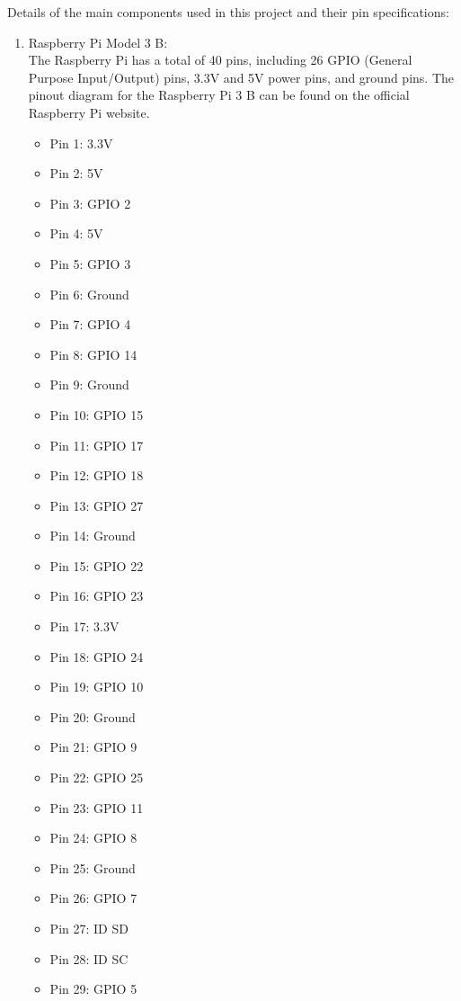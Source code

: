 \documentclass[11pt]{article}
\begin{document}
Details of the main components used in this project and their pin specifications:

\begin{enumerate}
	\item Raspberry Pi Model 3 B: \\
	      The Raspberry Pi has a total of 40 pins, including 26 GPIO (General Purpose Input/Output) pins, 3.3V and 5V power pins, and ground pins. The pinout diagram for the Raspberry Pi 3 B can be found on the official Raspberry Pi website.

	      \begin{itemize}
		      \item Pin 1: 3.3V
		      \item Pin 2: 5V
		      \item Pin 3: GPIO 2
		      \item Pin 4: 5V
		      \item Pin 5: GPIO 3
		      \item Pin 6: Ground
		      \item Pin 7: GPIO 4
		      \item Pin 8: GPIO 14
		      \item Pin 9: Ground
		      \item Pin 10: GPIO 15
		      \item Pin 11: GPIO 17
		      \item Pin 12: GPIO 18
		      \item Pin 13: GPIO 27
		      \item Pin 14: Ground
		      \item Pin 15: GPIO 22
		      \item Pin 16: GPIO 23
		      \item Pin 17: 3.3V
		      \item Pin 18: GPIO 24
		      \item Pin 19: GPIO 10
		      \item Pin 20: Ground
		      \item Pin 21: GPIO 9
		      \item Pin 22: GPIO 25
		      \item Pin 23: GPIO 11
		      \item Pin 24: GPIO 8
		      \item Pin 25: Ground
		      \item Pin 26: GPIO 7
		      \item Pin 27: ID SD
		      \item Pin 28: ID SC
		      \item Pin 29: GPIO 5

\end{itemize}
\end{enumerate}
\end{document}
